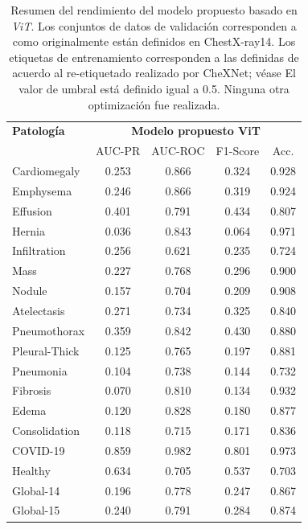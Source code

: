 \begin{table}[tb]
    \centering
    \begin{tabular}{|l||c|c|c|c|}
        \hline
    {\bf Patología} 	    	&	\multicolumn{4}{c|}{\bf Modelo propuesto ViT}  \\
    \cline{2-5}
                        &	AUC-PR	&	AUC-ROC 	& F1-Score  & Acc.  \\
        \hline \hline
        Cardiomegaly	&	0.253	&	0.866	&	0.324	&	0.928	\\
        Emphysema	    &	0.246	&	0.866	&	0.319	&	0.924	\\
        Effusion	    &	0.401	&	0.791	&	0.434	&	0.807	\\
        Hernia	        &	0.036	&	0.843	&	0.064	&	0.971	\\
        Infiltration	&	0.256	&	0.621	&	0.235	&	0.724	\\
        Mass	        &	0.227	&	0.768	&	0.296	&	0.900	\\
        Nodule	        &	0.157	&	0.704	&	0.209	&	0.908	\\
        Atelectasis	    &	0.271	&	0.734	&	0.325	&	0.840	\\
        Pneumothorax	&	0.359	&	0.842	&	0.430	&	0.880	\\
        Pleural-Thick	&	0.125	&	0.765	&	0.197	&	0.881	\\
        Pneumonia	    &	0.104	&	0.738	&	0.144	&	0.732	\\
        Fibrosis	    &	0.070	&	0.810	&	0.134	&	0.932	\\
        Edema	        &	0.120	&	0.828	&	0.180	&	0.877	\\
        Consolidation	&	0.118	&	0.715	&	0.171	&	0.836	\\
        \hline
        COVID-19	    &	0.859	&	0.982	&	0.801	&	0.973	\\
        Healthy	        &	0.634	&	0.705	&	0.537	&	0.703	\\
        \hline\hline
        Global-14	    &	0.196	&	0.778	&	0.247	&	0.867	\\
        Global-15	    &	0.240	&	0.791	&	0.284	&	0.874	\\
    \hline
    \end{tabular}
    \caption{Resumen del rendimiento del modelo propuesto basado en \textit{ViT}.
            Los conjuntos de datos de validación corresponden a como originalmente
            están definidos en ChestX-ray14. Los etiquetas de entrenamiento corresponden a las
            definidas de acuerdo al re-etiquetado realizado por CheXNet; véase \cite{rajpurkar2018deep}
            El valor de umbral está definido igual a 0.5. Ninguna otra optimización fue realizada.}
    \label{table:vit-model-covid}
\end{table}

